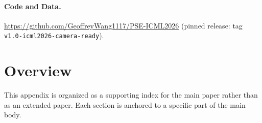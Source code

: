 \documentclass{article}
\theoremstyle{plain}
\theoremstyle{definition}
\begin{document}
\paragraph{Code and Data.} \url{https://github.com/GeoffreyWang1117/PSE-ICML2026} (pinned release: tag \texttt{v1.0-icml2026-camera-ready}).





\onecolumn
\appendix

\section*{Overview}

This appendix is organized as a supporting index for the main paper rather than as an extended paper. Each section is anchored to a specific part of the main body.
\end{document}
